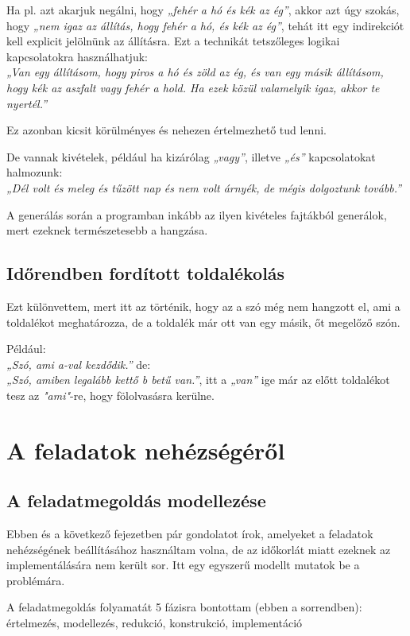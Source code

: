 \documentclass[12pt]{report}
\theoremstyle{definition}
\begin{document}
Ha pl. azt akarjuk negálni, hogy \textit{„fehér a hó és kék az ég”}, akkor azt úgy szokás, hogy \textit{„nem igaz az állítás, hogy fehér a hó, és kék az ég”}, tehát itt egy indirekciót kell explicit jelölnünk az állításra. Ezt a technikát tetszőleges logikai kapcsolatokra használhatjuk:\\
\textit{„Van egy állításom, hogy piros a hó és zöld az ég, és van egy másik állításom, hogy kék az aszfalt vagy fehér a hold. Ha ezek közül valamelyik igaz, akkor te nyertél.”}

Ez azonban kicsit körülményes és nehezen értelmezhető tud lenni.

De vannak kivételek, például ha kizárólag \textit{„vagy”}, illetve \textit{„és”} kapcsolatokat halmozunk:\\
\textit{„Dél volt és meleg és tűzött nap és nem volt árnyék, de mégis dolgoztunk tovább.”}

A generálás során a programban inkább az ilyen kivételes fajtákból generálok, mert ezeknek természetesebb a hangzása.

\section{Időrendben fordított toldalékolás}
Ezt különvettem, mert itt az történik, hogy az a szó még nem hangzott el, ami a toldalékot meghatározza, de a toldalék már ott van egy másik, őt megelőző szón.

Például:\\
\textit{„Szó, ami a-val kezdődik.”} de:\\
\textit{„Szó, amiben legalább kettő b betű van.”}, itt a \textit{„van”} ige már az előtt toldalékot tesz az \textit{"ami"}-re, hogy fölolvasásra kerülne.

\chapter{A feladatok nehézségéről}
\section{A feladatmegoldás modellezése}
Ebben és a következő fejezetben pár gondolatot írok, amelyeket a feladatok nehézségének beállításához használtam volna, de az időkorlát miatt ezeknek az implementálására nem került sor. Itt egy egyszerű modellt mutatok be a problémára.

A feladatmegoldás folyamatát 5 fázisra bontottam (ebben a sorrendben):\\
értelmezés, modellezés, redukció, konstrukció, implementáció
\end{document}
